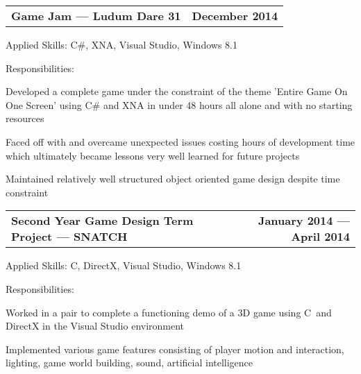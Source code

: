 \documentclass[10pt,letterpaper]{article}
\makeatletter
\newenvironment{indentsection}[1]%
{\begin{list}{}%
  {\setlength{\leftmargin}{#1}}%
  \item[]%
}
{\end{list}}
\newcommand{\headerrow}[2]
{\begin{tabular*}{\linewidth}{l@{\extracolsep{\fill}}r}
  #1 &
  #2 \\
\end{tabular*}}
\newcommand{\CPP}
{C\nolinebreak[4]\hspace{-.05em}\raisebox{.22ex}{\footnotesize\bf ++}}
\makeatother
\begin{document}
\begin{itemize}
  \item
  \headerrow
    {\textbf{Game Jam — Ludum Dare 31}}
    {\textbf{December 2014}}
  \begin{indentsection}{1em}
    \begin{description*}
      \item[Applied Skills:]
      C\#, XNA, Visual Studio, Windows 8.1
      \item[Responsibilities:]
      \hfill
      \begin{itemize*}
        \item Developed a complete game under the constraint of the theme 'Entire
        Game On One Screen' using C\# and XNA in under 48 hours all alone and with
        no starting resources
        \item Faced off with and overcame unexpected issues costing hours of
        development time which ultimately became lessons very well learned for
        future projects
        \item Maintained relatively well structured object oriented game design
        despite time constraint
      \end{itemize*}
    \end{description*}
  \end{indentsection}

  \item
  \headerrow
    {\textbf{Second Year Game Design Term Project — SNATCH}}
    {\textbf{January 2014 — April 2014}}
  \begin{indentsection}{1em}
    \begin{description*}
      \item[Applied Skills:]
      \CPP, DirectX, Visual Studio, Windows 8.1
      \item[Responsibilities:]
      \hfill
      \begin{itemize*}
        \item Worked in a pair to complete a functioning demo of a 3D game using
        \CPP\ and DirectX in the Visual Studio environment
        \item Implemented various game features consisting of player motion and
        interaction, lighting, game world building, sound, artificial intelligence
      \end{itemize*}
    \end{description*}
  \end{indentsection}


\end{itemize}
\end{document}
